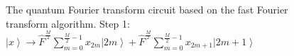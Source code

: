 \begin{figure}
\centering



\caption{The quantum Fourier transform circuit based on the fast
  Fourier transform algorithm. Step 1: 
$\left|x\right> \rightarrow
\hat{F}^{\frac{M}{2}} \sum_{m = 0}^{\frac{M}{2} - 1}x_{2m} \left|2m\right> +
\hat{F}^{\frac{M}{2}} \sum_{m = 0}^{\frac{M}{2} - 1}x_{2m + 1} \left|2m+1\right>$}
\label{figQuantCompQuantFourier1}
\end{figure}
